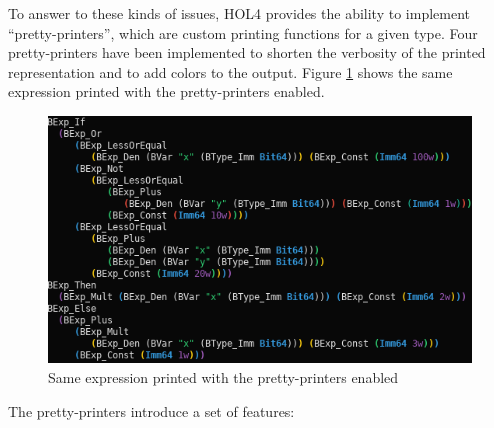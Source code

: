 \documentclass{kththesis}
\begin{document}
{

To answer to these kinds of issues, HOL4 provides the ability to implement ``pretty-printers'', which are custom printing functions for a given type. Four pretty-printers have been implemented to shorten the verbosity of the printed representation and to add colors to the output. Figure \ref{pp_ex_pretty_printing} shows the same expression printed with the pretty-printers enabled.

\begin{figure}[!h]
	\includegraphics[width=\textwidth]{figures/pp_ex_pretty_printing.png}
	\centering
	\caption{Same expression printed with the pretty-printers enabled}
	\label{pp_ex_pretty_printing}
\end{figure}

The pretty-printers introduce a set of features:

}
\end{document}
